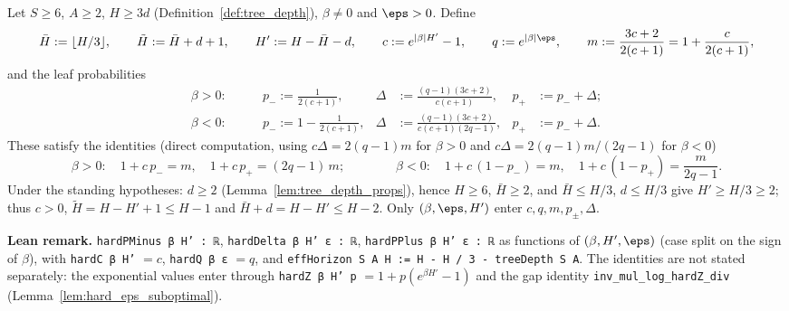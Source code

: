 \begin{definition}\label{def:hard_params}
\leanok
Let $S \ge 6$, $A \ge 2$, $H \ge 3d$ (Definition~\ref{def:tree_depth}), $\beta \ne 0$ and $\eps > 0$.
Define
\[
  \bar H := \lfloor H/3 \rfloor, \qquad \tilde H := \bar H + d + 1, \qquad H' := H - \bar H - d, \qquad
  c := e^{|\beta| H'} - 1, \qquad q := e^{|\beta|\eps}, \qquad m := \frac{3c + 2}{2(c+1)} = 1 + \frac{c}{2(c+1)},
\]
and the leaf probabilities
\begin{align*}
  \beta > 0:\qquad & p_- := \frac{1}{2(c+1)}, & \Delta &:= \frac{(q - 1)(3c+2)}{c(c+1)}, & p_+ &:= p_- + \Delta ; \\
  \beta < 0:\qquad & p_- := 1 - \frac{1}{2(c+1)}, & \Delta &:= \frac{(q-1)(3c+2)}{c(c+1)(2q-1)}, & p_+ &:= p_- + \Delta .
\end{align*}
These satisfy the identities (direct computation, using $c\Delta = 2(q-1)m$ for $\beta > 0$ and
$c\Delta = 2(q-1)m/(2q-1)$ for $\beta < 0$)
\[
  \beta > 0:\quad 1 + c\,p_- = m, \quad 1 + c\,p_+ = (2q - 1)\,m; \qquad\qquad
  \beta < 0:\quad 1 + c\,(1 - p_-) = m, \quad 1 + c\,(1 - p_+) = \frac{m}{2q-1} .
\]
Under the standing hypotheses: $d \ge 2$ (Lemma~\ref{lem:tree_depth_props}), hence $H \ge 6$,
$\bar H \ge 2$, and $\bar H \le H/3$, $d \le H/3$ give $H' \ge H/3 \ge 2$; thus $c > 0$,
$\tilde H = H - H' + 1 \le H - 1$ and $\bar H + d = H - H' \le H - 2$. Only $(\beta, \eps, H')$ enter
$c, q, m, p_\pm, \Delta$.
\end{definition}

\textbf{Lean remark.} \texttt{hardPMinus β H' : ℝ}, \texttt{hardDelta β H' ε : ℝ},
\texttt{hardPPlus β H' ε : ℝ} as functions of $(\beta, H', \eps)$ (case split on the sign of $\beta$),
with \texttt{hardC β H'} $= c$, \texttt{hardQ β ε} $= q$, and \texttt{effHorizon S A H := H - H / 3 - treeDepth S A}.
The identities are not stated separately: the exponential values enter through
\texttt{hardZ β H' p} $= 1 + p(e^{\beta H'} - 1)$ and the gap identity \texttt{inv\_mul\_log\_hardZ\_div}
(Lemma~\ref{lem:hard_eps_suboptimal}).

